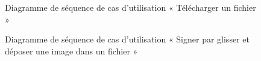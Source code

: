\begin{figure}[H]
  \centering
  \caption{Diagramme de séquence de cas d'utilisation « Télécharger un fichier   »}
  \label{fig:sequence_download_file}
\end{figure}
\begin{figure}[H]
  \centering
  \caption{Diagramme de séquence de cas d'utilisation « Signer par glisser et déposer une image dans un fichier   »}
  \label{fig:sequence_sign_by_image}
\end{figure}

